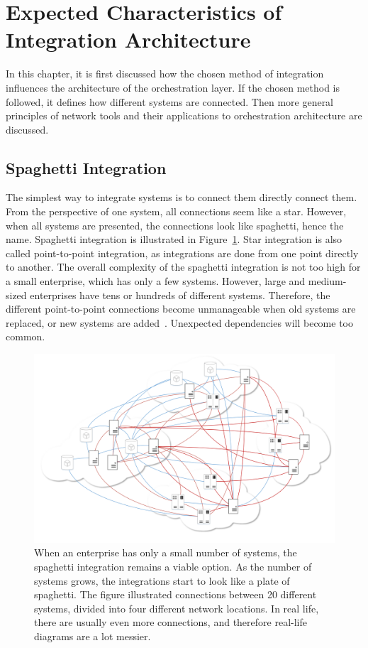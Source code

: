 \documentclass[english, 12pt, a4paper, sci, utf8, a-2b, online, obeyspaces]{aaltothesis}
\begin{document}
\clearpage
\section{Expected Characteristics of Integration Architecture}
\label{sec:methods_of_integration}
In this chapter, it is first discussed how the chosen method of integration influences the architecture of the orchestration layer. If the chosen method is followed, it defines how different systems are connected. Then more general principles of network tools and their applications to orchestration architecture are discussed.

\subsection{Spaghetti Integration}
The simplest way to integrate systems is to connect them directly connect them. From the perspective of one system, all connections seem like a star. However, when all systems are presented, the connections look like spaghetti, hence the name. Spaghetti integration is illustrated in Figure~\ref{fig:spaghetti}. Star integration is also called point-to-point integration, as integrations are done from one point directly to another. The overall complexity of the spaghetti integration is not too high for a small enterprise, which has only a few systems. However, large and medium-sized enterprises have tens or hundreds of different systems. Therefore, the different point-to-point connections become unmanageable when old systems are replaced, or new systems are added~\cite{josuttis2007soa}. Unexpected dependencies will become too common. 

\begin{figure}[htb]
  \centering
      \includegraphics[width=\textwidth]{pictures/Architecture/Integraatiospagetti.png}
  \caption{When an enterprise has only a small number of systems, the spaghetti integration remains a viable option. As the number of systems grows, the integrations start to look like a plate of spaghetti. The figure illustrated connections between 20 different systems, divided into four different network locations. In real life, there are usually even more connections, and therefore real-life diagrams are a lot messier.}
  \label{fig:spaghetti}
\end{figure}
\end{document}
